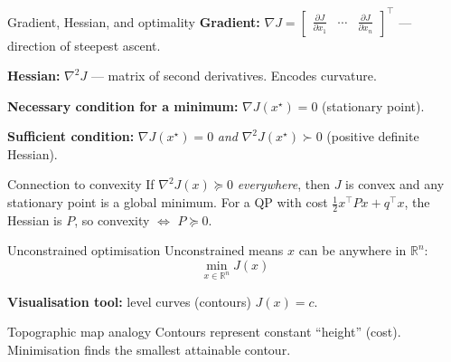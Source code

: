 \documentclass[aspectratio=169,10pt]{beamer}
\newcommand{\R}{\mathbb{R}}
\begin{document}
\begin{frame}{Gradient, Hessian, and optimality}
\textbf{Gradient:} $\nabla J = \begin{bmatrix} \frac{\partial J}{\partial x_1} & \cdots & \frac{\partial J}{\partial x_n} \end{bmatrix}^\top$ --- direction of steepest ascent.

\vspace{0.3em}
\textbf{Hessian:} $\nabla^2 J$ --- matrix of second derivatives. Encodes curvature.

\vspace{0.3em}
\textbf{Necessary condition for a minimum:} $\nabla J(x^\star) = 0$ \quad (stationary point).

\vspace{0.3em}
\textbf{Sufficient condition:} $\nabla J(x^\star) = 0$ \emph{and} $\nabla^2 J(x^\star) \succ 0$ \quad (positive definite Hessian).

\vspace{0.5em}
\begin{notebox}{Connection to convexity}
If $\nabla^2 J(x) \succeq 0$ \emph{everywhere}, then $J$ is convex and any stationary point is a global minimum. For a QP with cost $\frac{1}{2}x^\top P x + q^\top x$, the Hessian is $P$, so convexity $\Leftrightarrow$ $P \succeq 0$.
\end{notebox}
\end{frame}

\begin{frame}{Unconstrained optimisation}
Unconstrained means $x$ can be anywhere in $\R^n$:
\begin{equation*}
\min_{x\in\R^n} J(x)
\end{equation*}

\textbf{Visualisation tool:} level curves (contours) $J(x)=c$.
\begin{notebox}{Topographic map analogy}
Contours represent constant ``height'' (cost). Minimisation finds the smallest attainable contour.
\end{notebox}
\end{frame}
\end{document}

